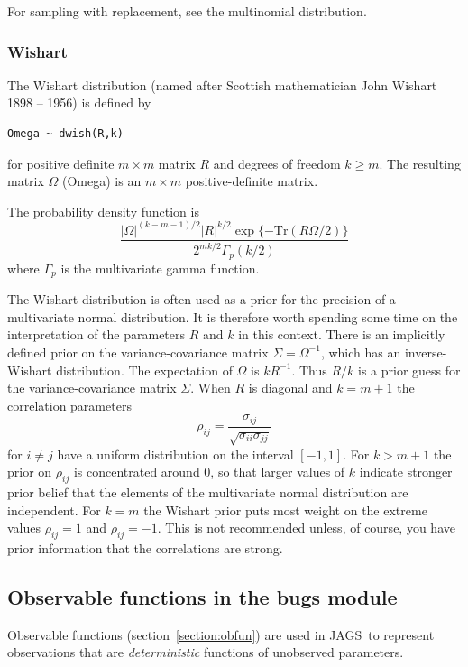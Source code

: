 \documentclass[11pt, a4paper, titlepage]{report}
\newcommand{\JAGS}{\textsf{JAGS}}
\begin{document}
For sampling with replacement, see the multinomial distribution.

\subsubsection{Wishart}
\label{bugs:dwishart}

The Wishart distribution (named after Scottish mathematician John
Wishart 1898 -- 1956) is defined by
\begin{verbatim}
Omega ~ dwish(R,k)
\end{verbatim}
for positive definite $m \times m$ matrix $R$ and degrees of freedom
$k \geq m$. The resulting matrix $\Omega$ (Omega) is an $m \times m$
positive-definite matrix.

The probability density function is
\[
\frac{\textstyle |\Omega|^{(k-m-1)/2} |R|^{k/2}
  \exp\{-\text{Tr}(R\Omega/2)\}} {\textstyle 2^{mk/2} \Gamma_p
  (k/2)}
\]
where $\Gamma_p$ is the multivariate gamma function.

The Wishart distribution is often used as a prior for the precision of
a multivariate normal distribution. It is therefore worth spending
some time on the interpretation of the parameters $R$ and $k$ in this
context. There is an implicitly defined prior on the
variance-covariance matrix $\Sigma = \Omega^{-1}$, which has an
inverse-Wishart distribution. The expectation of $\Omega$ is
$kR^{-1}$. Thus $R/k$ is a prior guess for the variance-covariance
matrix $\Sigma$. When $R$ is diagonal and $k=m+1$ the correlation
parameters
\[
\rho_{ij} = \frac{\sigma_{ij}}{\sqrt{\sigma_{ii} \sigma_{jj}}}
\]
for $i \neq j$ have a uniform distribution on the interval
$[-1,1]$. For $k > m+1$ the prior on $\rho_{ij}$ is concentrated
around $0$, so that larger values of $k$ indicate stronger prior
belief that the elements of the multivariate normal distribution are
independent. For $k=m$ the Wishart prior puts most weight on the
extreme values $\rho_{ij} = 1$ and $\rho_{ij} = -1$. This is not
recommended unless, of course, you have prior information that the
correlations are strong.

\subsection{Observable functions in the bugs module}
\label{section:bugs:obfun}

Observable functions (section~\ref{section:obfun}) are used in
\JAGS\ to represent observations that are {\em deterministic}
functions of unobserved parameters.
\end{document}
